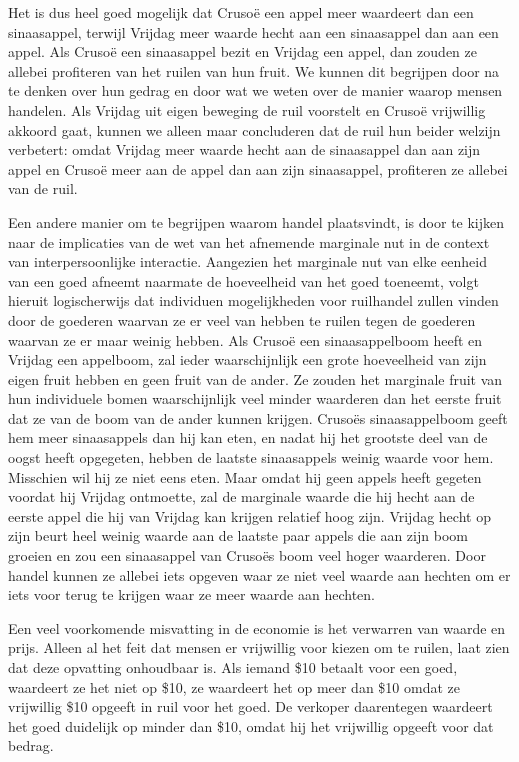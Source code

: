 Het is dus heel goed mogelijk dat Crusoë een appel meer waardeert dan een sinaasappel, terwijl Vrijdag meer waarde hecht aan een sinaasappel dan aan een appel. Als Crusoë een sinaasappel bezit en Vrijdag een appel, dan zouden ze allebei profiteren van het ruilen van hun fruit. We kunnen dit begrijpen door na te denken over hun gedrag en door wat we weten over de manier waarop mensen handelen. Als Vrijdag uit eigen beweging de ruil voorstelt en Crusoë vrijwillig akkoord gaat, kunnen we alleen maar concluderen dat de ruil hun beider welzijn verbetert: omdat Vrijdag meer waarde hecht aan de sinaasappel dan aan zijn appel en Crusoë meer aan de appel dan aan zijn sinaasappel, profiteren ze allebei van de ruil.

Een andere manier om te begrijpen waarom handel plaatsvindt, is door te kijken naar de implicaties van de wet van het afnemende marginale nut in de context van interpersoonlijke interactie. Aangezien het marginale nut van elke eenheid van een goed afneemt naarmate de hoeveelheid van het goed toeneemt, volgt hieruit logischerwijs dat individuen mogelijkheden voor ruilhandel zullen vinden door de goederen waarvan ze er veel van hebben te ruilen tegen de goederen waarvan ze er maar weinig hebben. Als Crusoë een sinaasappelboom heeft en Vrijdag een appelboom, zal ieder waarschijnlijk een grote hoeveelheid van zijn eigen fruit hebben en geen fruit van de ander. Ze zouden het marginale fruit van hun individuele bomen waarschijnlijk veel minder waarderen dan het eerste fruit dat ze van de boom van de ander kunnen krijgen. Crusoë\textquotesingle s sinaasappelboom geeft hem meer sinaasappels dan hij kan eten, en nadat hij het grootste deel van de oogst heeft opgegeten, hebben de laatste sinaasappels weinig waarde voor hem. Misschien wil hij ze niet eens eten. Maar omdat hij geen appels heeft gegeten voordat hij Vrijdag ontmoette, zal de marginale waarde die hij hecht aan de eerste appel die hij van Vrijdag kan krijgen relatief hoog zijn. Vrijdag hecht op zijn beurt heel weinig waarde aan de laatste paar appels die aan zijn boom groeien en zou een sinaasappel van Crusoë\textquotesingle s boom veel hoger waarderen. Door handel kunnen ze allebei iets opgeven waar ze niet veel waarde aan hechten om er iets voor terug te krijgen waar ze meer waarde aan hechten.

Een veel voorkomende misvatting in de economie is het verwarren van waarde en prijs. Alleen al het feit dat mensen er vrijwillig voor kiezen om te ruilen, laat zien dat deze opvatting onhoudbaar is. Als iemand \$10 betaalt voor een goed, waardeert ze het niet op \$10, ze waardeert het op meer dan \$10 omdat ze vrijwillig \$10 opgeeft in ruil voor het goed. De verkoper daarentegen waardeert het goed duidelijk op minder dan \$10, omdat hij het vrijwillig opgeeft voor dat bedrag.

